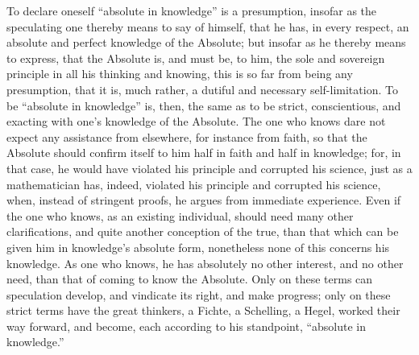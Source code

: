\documentclass[12pt]{book}
\begin{document}
To declare oneself ``absolute in knowledge'' is a presumption, insofar as the speculating one thereby means to say of himself, that he has, in every respect, an absolute and perfect knowledge of the Absolute; but insofar as he thereby means to express, that the Absolute is, and must be, to him, the sole and sovereign principle in all his thinking and knowing, this is so far from being any presumption, that it is, much rather, a dutiful and necessary self-limitation. To be ``absolute in knowledge'' is, then, the same as to be strict, conscientious, and exacting with one's knowledge of the Absolute. The one who knows dare not expect any assistance from elsewhere, for instance from faith, so that the Absolute should confirm itself to him half in faith and half in knowledge; for, in that case, he would have violated his principle and corrupted his science, just as a mathematician has, indeed, violated his principle and corrupted his science, when, instead of stringent proofs, he argues from immediate experience. Even if the one who knows, as an existing individual, should need many other
clarifications, and quite another conception of the true, than that which can be given him in knowledge's absolute form, nonetheless none of this concerns his knowledge. As one who knows, he has absolutely no other interest, and no other need, than that of coming to know the Absolute. Only on these terms can speculation develop, and vindicate its right, and make progress; only on these strict terms have the great thinkers, a Fichte, a Schelling, a Hegel, worked their way forward, and become, each according to his standpoint, ``absolute in knowledge.''
\end{document}
